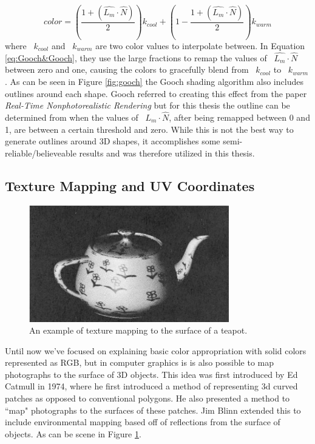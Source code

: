 \begin{equation}
\label{eq:Gooch&Gooch}
color = \left(\frac{1 + (\hat{L_{m}} \cdot \hat{N})}{2}\right) k_{cool} + \left(1-\frac{1 + (\hat{L_{m}} \cdot \hat{N})}{2}\right) k_{warm}
\end{equation}
where ~$k_{cool}$ and ~$k_{warm}$ are two color values to interpolate between. In Equation \ref{eq:Gooch&Gooch}, they use the large fractions to remap the values of ~$\hat{L_{m}} \cdot \hat{N}$ between zero and one, causing the colors to gracefully blend from ~$k_{cool}$ to ~$k_{warm}$.  As can be seen in Figure \ref{fig:gooch} the Gooch shading algorithm also includes outlines around each shape.  Gooch referred to creating this effect from the paper \textit{Real-Time Nonphotorealistic Rendering}\cite{markosian1997real} but for this thesis the outline can be determined from when the values of ~$\hat{L_{m}} \cdot \hat{N}$, after being remapped between 0 and 1, are between a certain threshold and zero.  While this is not the best way to generate outlines around 3D shapes, it accomplishes some semi-reliable/believeable results and was therefore utilized in this thesis.
\subsection{Texture Mapping and UV Coordinates}
\label{subsec:TexMap}
\begin{figure}[h]
\centering
\includegraphics[height=2.0in]{figures/flowerteapot.png}
\caption{An example of texture mapping to the surface of a teapot. \cite{blinn1976texture}}
\label{fig:teapot}
\end{figure}
Until now we've focused on explaining basic color appropriation with solid colors represented as RGB, but in computer graphics is is also possible to map photographs to the surface of 3D objects.  This idea was first introduced by Ed Catmull in 1974, where he first introduced a method of representing 3d curved patches as opposed to conventional polygons.  He also presented a method to ``map" photographs to the surfaces of these patches\cite{catmull1974subdivision}. Jim Blinn extended this to include environmental mapping based off of reflections from the surface of objects\cite{blinn1976texture}.  As can be scene in Figure \ref{fig:teapot}.

